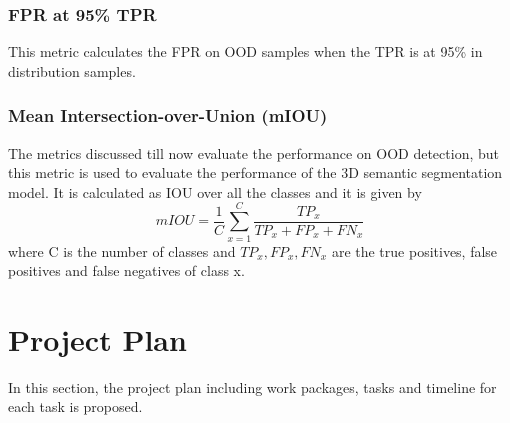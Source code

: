 \documentclass[thesis]{mas_proposal}
\begin{document}
\subsubsection{FPR at 95\% TPR}
This metric calculates the FPR on OOD samples when the TPR is at 95\% in distribution samples.
\subsubsection{Mean Intersection-over-Union (mIOU)}
The metrics discussed till now evaluate the performance on OOD detection, but this metric is used to evaluate the performance of the 3D semantic segmentation model.
It is calculated as IOU over all the classes and it is given by
$$
    mIOU=\frac{1}{C} \sum_{x=1}^C \frac{TP_x}{TP_x + FP_x + FN_x}
$$
where C is the number of classes and $TP_x, FP_x, FN_x$ are the true positives, false positives and false negatives of class x.

\section{Project Plan}
In this section, the project plan including work packages, tasks and timeline for each task is proposed.
\end{document}
